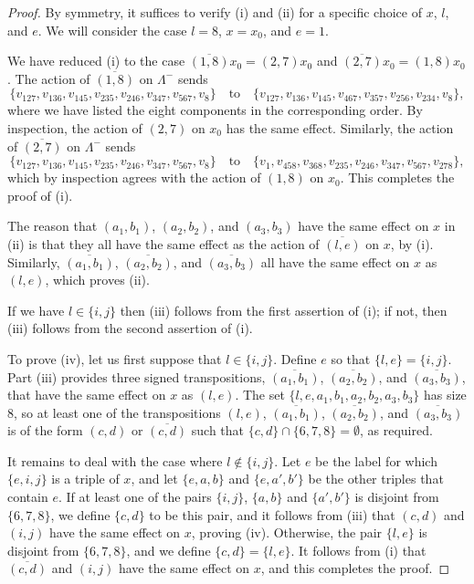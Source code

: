 \documentclass{amsart}
\theoremstyle{plain}
\theoremstyle{definition}
\theoremstyle{remark}
\numberwithin{equation}{section}
\newcommand{\lamm}{\Lambda^-}
\begin{document}
\begin{proof}
By symmetry, it suffices to verify (i) and (ii) for a specific choice of $x$, $l$, and $e$. We will consider 
the case $l = 8$, $x = x_0$, and $e = 1$.

We have reduced (i) to the case $\overline{(1, 8)}x_0 = (2, 7)x_0$ and $\overline{(2, 7)}x_0 = (1, 8)x_0$.
The action of $\overline{(1, 8)}$ on $\lamm$ sends $$
\{ v_{127},
v_{136},
v_{145},
v_{235},
v_{246},
v_{347},
v_{567},
v_{8}\} \quad \text{to} \quad 
\{ v_{127},
v_{136},
v_{145},
v_{467},
v_{357},
v_{256},
v_{234},
v_{8}\}
,$$ where we have listed the eight components in the corresponding order. By inspection, the action of $(2, 7)$ on
$x_0$ has the same effect. Similarly, the action of $\overline{(2, 7)}$ on $\lamm$ sends $$
\{ v_{127},
v_{136},
v_{145},
v_{235},
v_{246},
v_{347},
v_{567},
v_{8}\} \quad \text{to} \quad
\{ v_{1},
v_{458},
v_{368},
v_{235},
v_{246},
v_{347},
v_{567},
v_{278}\}
,$$ which by inspection agrees with the action of $(1, 8)$ on $x_0$. This completes the proof of (i).

The reason that $(a_1, b_1)$, $(a_2, b_2)$, and $(a_3, b_3)$ have the same effect on $x$ in (ii) is that they
all have the same effect as the action of $\overline{(l, e)}$ on $x$, by (i). Similarly,
$\overline{(a_1, b_1)}$, $\overline{(a_2, b_2)}$, and $\overline{(a_3, b_3)}$ all have the same effect on $x$
as $(l, e)$, which proves (ii).

If we have $l \in \{i, j\}$ then (iii) follows from the first assertion of (i); if not, then (iii) follows from
the second assertion of (i).

To prove (iv), let us first suppose that $l \in \{i, j\}$. Define $e$ so that $\{l, e\} = \{i, j\}$.
Part (iii) provides three signed transpositions, $\overline{(a_1, b_1)}$, $\overline{(a_2, b_2)}$, and 
$\overline{(a_3, b_3)}$, that have the same effect on $x$ as $(l, e)$. The set $\{l, e, a_1, b_1, a_2, b_2, a_3, b_3\}$
has size $8$, so at least one of the transpositions $(l, e)$, $\overline{(a_1, b_1)}$, $\overline{(a_2, b_2)}$, and 
$\overline{(a_3, b_3)}$ is of the form $(c, d)$ or $\overline{(c, d)}$ such that $\{c, d\} \cap \{6, 7, 8\} = \emptyset$, 
as required.

It remains to deal with the case where $l \not\in \{i, j\}$. Let $e$ be the label for which $\{e, i, j\}$
is a triple of $x$, and let $\{e, a, b\}$ and $\{e, a', b'\}$ be the other triples that contain $e$.
If at least one of the pairs $\{i, j\}$, $\{a, b\}$ and $\{a', b'\}$ is disjoint from $\{6, 7, 8\}$, we define
$\{c, d\}$ to be this pair, and it follows from (iii) that $(c, d)$ and $(i, j)$ have the same effect on $x$,
proving (iv). Otherwise, the pair $\{l, e\}$ is disjoint from $\{6, 7, 8\}$, and we define $\{c, d\} = \{l, e\}$.
It follows from (i) that $\overline{(c, d)}$ and $(i, j)$ have the same effect on $x$, and this completes the proof.
\end{proof}
\end{document}
